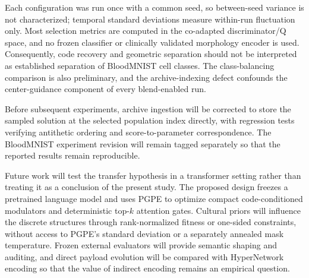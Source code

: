 Each configuration was run once with a common seed, so between-seed variance is not characterized; temporal standard deviations measure within-run fluctuation only. Most selection metrics are computed in the co-adapted discriminator/Q space, and no frozen classifier or clinically validated morphology encoder is used. Consequently, code recovery and geometric separation should not be interpreted as established separation of BloodMNIST cell classes. The class-balancing comparison is also preliminary, and the archive-indexing defect confounds the center-guidance component of every blend-enabled run.

Before subsequent experiments, archive ingestion will be corrected to store the sampled solution at the selected population index directly, with regression tests verifying antithetic ordering and score-to-parameter correspondence. The BloodMNIST experiment revision will remain tagged separately so that the reported results remain reproducible.

Future work will test the transfer hypothesis in a transformer setting rather than treating it as a conclusion of the present study. The proposed design freezes a pretrained language model and uses PGPE to optimize compact code-conditioned modulators and deterministic top-$k$ attention gates. Cultural priors will influence the discrete structures through rank-normalized fitness or one-sided constraints, without access to PGPE's standard deviation or a separately annealed mask temperature. Frozen external evaluators will provide semantic shaping and auditing, and direct payload evolution will be compared with HyperNetwork encoding so that the value of indirect encoding remains an empirical question.
